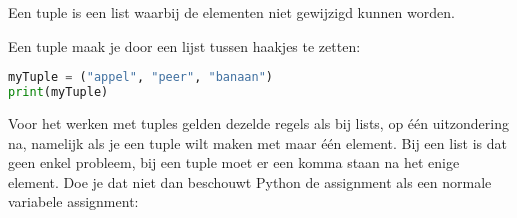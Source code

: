 Een tuple is een list waarbij de elementen niet gewijzigd kunnen worden.

Een tuple maak je door een lijst tussen haakjes te zetten:
\begin{lstlisting}[language=python]
myTuple = ("appel", "peer", "banaan")
print(myTuple)
\end{lstlisting}

Voor het werken met tuples gelden dezelde regels als bij lists, op \'e\'en uitzondering na, namelijk als je een tuple wilt maken met maar \'e\'en element. Bij een list is dat geen enkel probleem, bij een tuple moet er een komma staan na het enige element. Doe je dat niet dan beschouwt Python de assignment als een normale variabele assignment:


